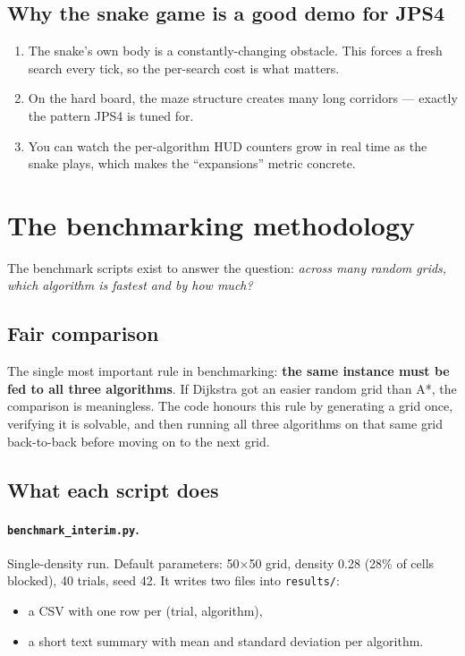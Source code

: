 \documentclass[11pt,a4paper]{article}
\begin{document}
\subsection{Why the snake game is a good demo for JPS4}

\begin{enumerate}[leftmargin=20pt,itemsep=2pt]
  \item The snake's own body is a constantly-changing obstacle. This forces a fresh search every tick, so the per-search cost is what matters.
  \item On the hard board, the maze structure creates many long corridors --- exactly the pattern JPS4 is tuned for.
  \item You can watch the per-algorithm HUD counters grow in real time as the snake plays, which makes the ``expansions'' metric concrete.
\end{enumerate}

\clearpage
\section{The benchmarking methodology}\label{sec:bench}

The benchmark scripts exist to answer the question: \emph{across many random grids, which algorithm is fastest and by how much?}

\subsection{Fair comparison}

The single most important rule in benchmarking: \textbf{the same instance must be fed to all three algorithms}. If Dijkstra got an easier random grid than A*, the comparison is meaningless. The code honours this rule by generating a grid once, verifying it is solvable, and then running all three algorithms on that same grid back-to-back before moving on to the next grid.

\subsection{What each script does}

\paragraph{\texttt{benchmark\_interim.py}.}
Single-density run. Default parameters: 50$\times$50 grid, density 0.28 (28\% of cells blocked), 40 trials, seed 42. It writes two files into \texttt{results/}:
\begin{itemize}[leftmargin=20pt,itemsep=1pt]
  \item a CSV with one row per (trial, algorithm),
  \item a short text summary with mean and standard deviation per algorithm.
\end{itemize}
\end{document}
